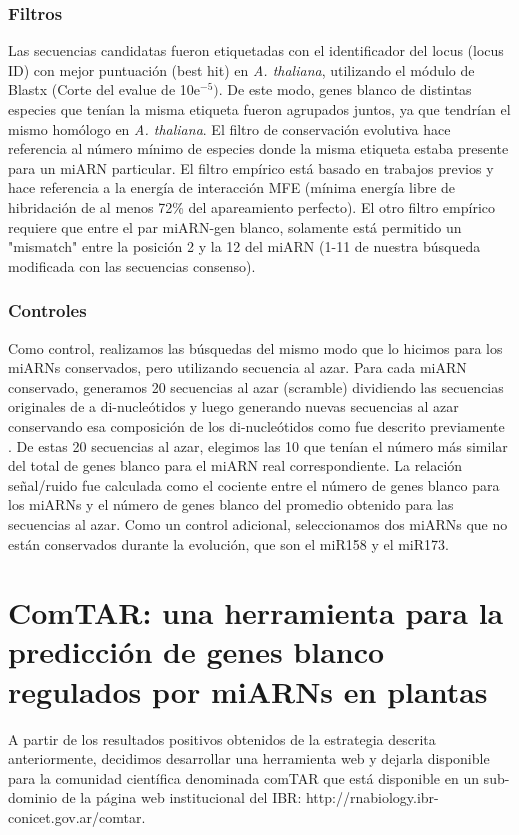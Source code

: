 \subsubsection{Filtros}
Las secuencias candidatas fueron etiquetadas con el identificador del locus (locus ID) con mejor puntuación (best hit) en \textit{A. thaliana}, utilizando el módulo de Blastx (Corte del evalue de 10e$^{-5})$.
De este modo, genes blanco de distintas especies que tenían la misma etiqueta fueron agrupados juntos, ya que tendrían el mismo homólogo en \textit{A. thaliana}.
El filtro de conservación evolutiva hace referencia al número mínimo de especies donde la misma etiqueta estaba presente para un miARN particular.
El filtro empírico está basado en trabajos previos \citep{Schwab2005517} y hace referencia a la energía de interacción MFE (mínima energía libre de hibridación de al menos 72\% del apareamiento perfecto).
El otro filtro empírico requiere que entre el par miARN-gen blanco, solamente está permitido un "mismatch" entre la posición 2 y la 12 del miARN (1-11 de nuestra búsqueda modificada con las secuencias consenso).

\subsubsection{Controles}
Como control, realizamos las búsquedas del mismo modo que lo hicimos para los miARNs conservados, pero utilizando secuencia al azar.
Para cada miARN conservado, generamos 20 secuencias al azar (scramble) dividiendo las secuencias originales de a di-nucleótidos y luego generando nuevas secuencias al azar conservando esa composición de los di-nucleótidos como fue descrito previamente \citep{JonesRhoades2004787}.
De estas 20 secuencias al azar, elegimos las 10 que tenían el número más similar del total de genes blanco para el miARN real correspondiente.
La relación señal/ruido fue calculada como el cociente entre el número de genes blanco para los miARNs y el número de genes blanco del promedio obtenido para las secuencias al azar.
Como un control adicional, seleccionamos dos miARNs que no están conservados durante la evolución, que son el miR158 y el miR173.


\section{ComTAR: una herramienta para la predicción de genes blanco regulados por miARNs en plantas}

A partir de los resultados positivos obtenidos de la estrategia descrita anteriormente, decidimos desarrollar una herramienta web y dejarla disponible para la comunidad científica denominada comTAR que está disponible en un sub-dominio de la página web institucional del IBR: http://rnabiology.ibr-conicet.gov.ar/comtar.


